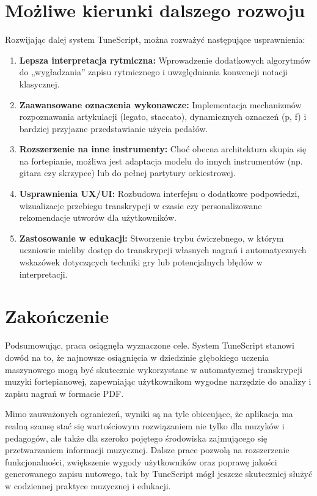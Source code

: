 \documentclass[a4paper,twoside,12pt]{book}
\begin{document}
\section{Możliwe kierunki dalszego rozwoju}
Rozwijając dalej system TuneScript, można rozważyć następujące usprawnienia:
\begin{enumerate}
    \item \textbf{Lepsza interpretacja rytmiczna:} Wprowadzenie dodatkowych algorytmów do „wygładzania” zapisu rytmicznego i uwzględniania konwencji notacji klasycznej.
    \item \textbf{Zaawansowane oznaczenia wykonawcze:} Implementacja mechanizmów rozpoznawania artykulacji (legato, staccato), dynamicznych oznaczeń (p, f) i bardziej przyjazne przedstawianie użycia pedałów.
    \item \textbf{Rozszerzenie na inne instrumenty:} Choć obecna architektura skupia się na fortepianie, możliwa jest adaptacja modelu do innych instrumentów (np. gitara czy skrzypce) lub do pełnej partytury orkiestrowej.
    \item \textbf{Usprawnienia UX/UI:} Rozbudowa interfejsu o dodatkowe podpowiedzi, wizualizacje przebiegu transkrypcji w czasie czy personalizowane rekomendacje utworów dla użytkowników.
    \item \textbf{Zastosowanie w edukacji:} Stworzenie trybu ćwiczebnego, w którym uczniowie mieliby dostęp do transkrypcji własnych nagrań i automatycznych wskazówek dotyczących techniki gry lub potencjalnych błędów w interpretacji.
\end{enumerate}

\section{Zakończenie}
Podsumowując, praca osiągnęła wyznaczone cele. System TuneScript stanowi dowód na to, że najnowsze osiągnięcia w dziedzinie głębokiego uczenia maszynowego mogą być skutecznie wykorzystane w automatycznej transkrypcji muzyki fortepianowej, zapewniając użytkownikom wygodne narzędzie do analizy i zapisu nagrań w formacie PDF. 

Mimo zauważonych ograniczeń, wyniki są na tyle obiecujące, że aplikacja ma realną szansę stać się wartościowym rozwiązaniem nie tylko dla muzyków i pedagogów, ale także dla szeroko pojętego środowiska zajmującego się przetwarzaniem informacji muzycznej. Dalsze prace pozwolą na rozszerzenie funkcjonalności, zwiększenie wygody użytkowników oraz poprawę jakości generowanego zapisu nutowego, tak by TuneScript mógł jeszcze skuteczniej służyć w codziennej praktyce muzycznej i edukacji.
\end{document}
